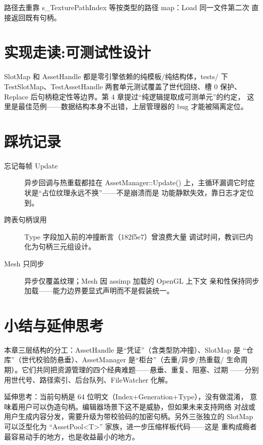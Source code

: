 路径去重靠 s\_TexturePathIndex 等按类型的路径 map：Load 同一文件第二次
直接返回既有句柄。

\section{实现走读:可测试性设计}

SlotMap 和 AssetHandle 都是零引擎依赖的纯模板/纯结构体，tests/ 下
TestSlotMap、TestAssetHandle 两套单元测试覆盖了世代回绕、槽 0 保护、
Replace 后句柄稳定性等边界。第 4 章提过``纯逻辑提取成可测单元''的约定，
这里是最佳范例——数据结构本身不出错，上层管理器的 bug 才能被隔离定位。

\section{踩坑记录}

\begin{description}
  \item[忘记每帧 Update] 异步回调与热重载都挂在 AssetManager::Update()
        上，主循环漏调它时症状是``占位纹理永远不换''——不是崩溃而是
        功能静默失效，靠日志才定位到。
  \item[跨表句柄误用] Type 字段加入前的冲撞断言（182f5e7）曾浪费大量
        调试时间，教训已内化为句柄三元组设计。
  \item[Mesh 只同步] 异步仅覆盖纹理；Mesh 因 assimp 加载的 OpenGL 上下文
        亲和性保持同步加载——能力边界要显式声明而不是假装统一。
\end{description}

\section{小结与延伸思考}

本章三层结构的分工：AssetHandle 是``凭证''（含类型防冲撞）、SlotMap 是
``仓库''（世代校验防悬垂）、AssetManager 是``柜台''（去重/异步/热重载/
生命周期）。它们共同把资源管理的四个经典难题——悬垂、重复、阻塞、过期
——分别用世代号、路径索引、后台队列、FileWatcher 化解。

延伸思考：当前句柄是 64 位明文（Index+Generation+Type），没有做混淆，
意味着用户可以伪造句柄。编辑器场景下这不是威胁，但如果未来支持网络
对战或用户生成内容分发，需要升级为带校验码的加密句柄。另外三张独立的
SlotMap 可以泛型化为 ``AssetPool<T>'' 家族，进一步压缩样板代码——这是
重构成瘾者最容易动手的地方，也是收益最小的地方。
